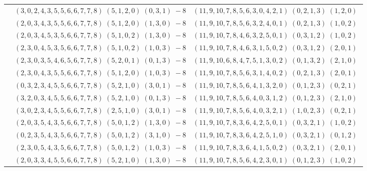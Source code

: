 \documentclass[11pt]{article}
\begin{document}
\begin{longtable}[l]{|c|c|c|}
 \cline{2-3} 
 & $(3 ,0 ,2 ,4 ,3 ,5 ,5 ,6 ,6 ,7 ,7 ,8) \;(5 ,1 ,2 ,0) \;(0 ,3 ,1) \;-8$ & $(11 ,9 ,10 ,7 ,8 ,5 ,6 ,3 ,0 ,4 ,2 ,1) \;(0 ,2 ,1 ,3) \;(1 ,2 ,0) \;$\\ 
 \cline{2-3} 
 & $(2 ,0 ,3 ,4 ,3 ,5 ,5 ,6 ,6 ,7 ,7 ,8) \;(5 ,1 ,2 ,0) \;(1 ,3 ,0) \;-8$ & $(11 ,9 ,10 ,7 ,8 ,5 ,6 ,3 ,2 ,4 ,0 ,1) \;(0 ,2 ,1 ,3) \;(1 ,0 ,2) \;$\\ 
 \cline{2-3} 
 & $(2 ,0 ,3 ,4 ,5 ,3 ,5 ,6 ,6 ,7 ,7 ,8) \;(5 ,1 ,0 ,2) \;(1 ,3 ,0) \;-8$ & $(11 ,9 ,10 ,7 ,8 ,4 ,6 ,3 ,2 ,5 ,0 ,1) \;(0 ,3 ,1 ,2) \;(1 ,0 ,2) \;$\\ 
 \cline{2-3} 
 & $(2 ,3 ,0 ,4 ,5 ,3 ,5 ,6 ,6 ,7 ,7 ,8) \;(5 ,1 ,0 ,2) \;(1 ,0 ,3) \;-8$ & $(11 ,9 ,10 ,7 ,8 ,4 ,6 ,3 ,1 ,5 ,0 ,2) \;(0 ,3 ,1 ,2) \;(2 ,0 ,1) \;$\\ 
 \cline{2-3} 
 & $(2 ,3 ,0 ,3 ,5 ,4 ,6 ,5 ,6 ,7 ,7 ,8) \;(5 ,2 ,0 ,1) \;(0 ,1 ,3) \;-8$ & $(11 ,9 ,10 ,6 ,8 ,4 ,7 ,5 ,1 ,3 ,0 ,2) \;(0 ,1 ,3 ,2) \;(2 ,1 ,0) \;$\\ 
 \cline{2-3} 
 & $(2 ,3 ,0 ,4 ,3 ,5 ,5 ,6 ,6 ,7 ,7 ,8) \;(5 ,1 ,2 ,0) \;(1 ,0 ,3) \;-8$ & $(11 ,9 ,10 ,7 ,8 ,5 ,6 ,3 ,1 ,4 ,0 ,2) \;(0 ,2 ,1 ,3) \;(2 ,0 ,1) \;$\\ 
 \cline{2-3} 
 & $(0 ,3 ,2 ,3 ,4 ,5 ,5 ,6 ,6 ,7 ,7 ,8) \;(5 ,2 ,1 ,0) \;(3 ,0 ,1) \;-8$ & $(11 ,9 ,10 ,7 ,8 ,5 ,6 ,4 ,1 ,3 ,2 ,0) \;(0 ,1 ,2 ,3) \;(0 ,2 ,1) \;$\\ 
 \cline{2-3} 
 & $(3 ,2 ,0 ,3 ,4 ,5 ,5 ,6 ,6 ,7 ,7 ,8) \;(5 ,2 ,1 ,0) \;(0 ,1 ,3) \;-8$ & $(11 ,9 ,10 ,7 ,8 ,5 ,6 ,4 ,0 ,3 ,1 ,2) \;(0 ,1 ,2 ,3) \;(2 ,1 ,0) \;$\\ 
 \cline{2-3} 
 & $(3 ,0 ,2 ,3 ,4 ,5 ,5 ,6 ,6 ,7 ,7 ,8) \;(2 ,5 ,1 ,0) \;(3 ,0 ,1) \;-8$ & $(11 ,9 ,10 ,7 ,8 ,5 ,6 ,4 ,0 ,3 ,2 ,1) \;(1 ,0 ,2 ,3) \;(0 ,2 ,1) \;$\\ 
 \cline{2-3} 
 & $(2 ,0 ,3 ,5 ,4 ,3 ,5 ,6 ,6 ,7 ,7 ,8) \;(5 ,0 ,1 ,2) \;(1 ,3 ,0) \;-8$ & $(11 ,9 ,10 ,7 ,8 ,3 ,6 ,4 ,2 ,5 ,0 ,1) \;(0 ,3 ,2 ,1) \;(1 ,0 ,2) \;$\\ 
 \cline{2-3} 
 & $(0 ,2 ,3 ,5 ,4 ,3 ,5 ,6 ,6 ,7 ,7 ,8) \;(5 ,0 ,1 ,2) \;(3 ,1 ,0) \;-8$ & $(11 ,9 ,10 ,7 ,8 ,3 ,6 ,4 ,2 ,5 ,1 ,0) \;(0 ,3 ,2 ,1) \;(0 ,1 ,2) \;$\\ 
 \cline{2-3} 
 & $(2 ,3 ,0 ,5 ,4 ,3 ,5 ,6 ,6 ,7 ,7 ,8) \;(5 ,0 ,1 ,2) \;(1 ,0 ,3) \;-8$ & $(11 ,9 ,10 ,7 ,8 ,3 ,6 ,4 ,1 ,5 ,0 ,2) \;(0 ,3 ,2 ,1) \;(2 ,0 ,1) \;$\\ 
 \cline{2-3} 
 & $(2 ,0 ,3 ,3 ,4 ,5 ,5 ,6 ,6 ,7 ,7 ,8) \;(5 ,2 ,1 ,0) \;(1 ,3 ,0) \;-8$ & $(11 ,9 ,10 ,7 ,8 ,5 ,6 ,4 ,2 ,3 ,0 ,1) \;(0 ,1 ,2 ,3) \;(1 ,0 ,2) \;$\\ 

\end{longtable}
\end{document}

